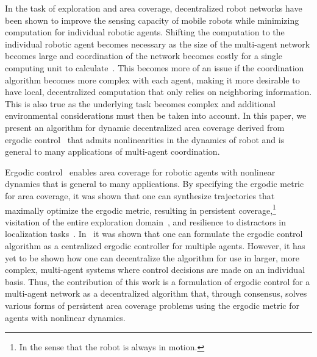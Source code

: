 \documentclass[letterpaper, 10 pt, conference]{ieeeconf}  %
\begin{document}
In the task of exploration and area coverage, decentralized robot networks have been shown to improve the sensing capacity of mobile robots \cite{carmel1999exploration, dudek1996taxonomy, manss2016decentralized} while minimizing computation for individual robotic agents. 
Shifting the computation to the individual robotic agent becomes necessary as the size of the multi-agent network becomes large and coordination of the network becomes costly for a single computing unit to calculate~\cite{manss2016decentralized, viseras2014efficient, khamis2014adaptive, pei2014distributed}.
This becomes more of an issue if the coordination algorithm becomes more complex with each agent, making it more desirable to have local, decentralized computation that only relies on neighboring information. 
This is also true as the underlying task becomes complex and additional environmental considerations must then be taken into account.
In this paper, we present an algorithm for dynamic decentralized area coverage derived from ergodic control~\cite{mavrommatiTRO2017realTime} that admits nonlinearities in the dynamics of robot and is general to many applications of multi-agent coordination.

Ergodic control~\cite{miller2013trajectory,miller2016ergodic,  mathew2011metrics, mavrommatiTRO2017realTime, shell2006ergodic} enables area coverage for robotic agents with nonlinear dynamics that is general to many applications.
By specifying the ergodic metric for area coverage, it was shown that one can synthesize trajectories that maximally optimize the ergodic metric, resulting in persistent coverage,\footnote{In the sense that the robot is always in motion.} visitation of the entire exploration domain~\cite{miller2013trajectory, miller2016ergodic, abraham2017ergodic}, and resilience to distractors in localization tasks~\cite{miller2015optimalrange, mavrommatiTRO2017realTime}.
In~\cite{mavrommatiTRO2017realTime} it was shown that one can formulate the ergodic control algorithm as a centralized ergodic controller for multiple agents.
However, it has yet to be shown how one can decentralize the algorithm for use in larger, more complex, multi-agent systems where control decisions are made on an individual basis.
Thus, the contribution of this work is a formulation of ergodic control for a multi-agent network as a decentralized algorithm that, through consensus, solves various forms of persistent area coverage problems using the ergodic metric for agents with nonlinear dynamics. 
\end{document}

